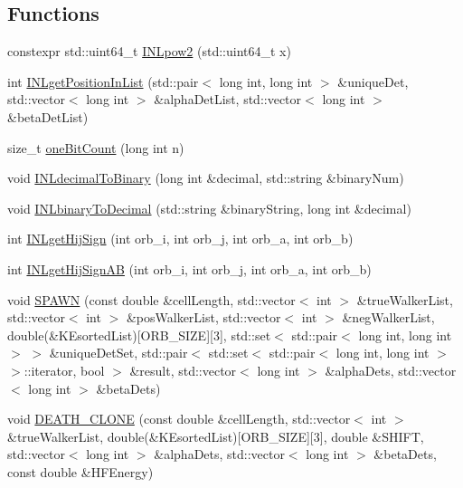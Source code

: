 \subsection*{Functions}
\begin{DoxyCompactItemize}
\item 
constexpr std\-::uint64\-\_\-t \hyperlink{UEG__MAIN__binarytest_8C_acc4e7d0bf8c76cb8b426703dc7115cdc}{I\-N\-Lpow2} (std\-::uint64\-\_\-t x)
\item 
int \hyperlink{UEG__MAIN__binarytest_8C_a622a9bfc71046778049dda8b8d82b829}{I\-N\-Lget\-Position\-In\-List} (std\-::pair$<$ long int, long int $>$ \&unique\-Det, std\-::vector$<$ long int $>$ \&alpha\-Det\-List, std\-::vector$<$ long int $>$ \&beta\-Det\-List)
\item 
size\-\_\-t \hyperlink{UEG__MAIN__binarytest_8C_a202c81ee7e30a4a9266c287caad49b02}{one\-Bit\-Count} (long int n)
\item 
void \hyperlink{UEG__MAIN__binarytest_8C_ad349fcf2533ef69216553d20f96d6320}{I\-N\-Ldecimal\-To\-Binary} (long int \&decimal, std\-::string \&binary\-Num)
\item 
void \hyperlink{UEG__MAIN__binarytest_8C_a34236e8d8d9c172c2a791f4e5f8c7e31}{I\-N\-Lbinary\-To\-Decimal} (std\-::string \&binary\-String, long int \&decimal)
\item 
int \hyperlink{UEG__MAIN__binarytest_8C_acc1ce2a3e5f999076de789546b8e277b}{I\-N\-Lget\-Hij\-Sign} (int orb\-\_\-i, int orb\-\_\-j, int orb\-\_\-a, int orb\-\_\-b)
\item 
int \hyperlink{UEG__MAIN__binarytest_8C_ae96d80bb5e115ea1aec37f72f2ac4979}{I\-N\-Lget\-Hij\-Sign\-A\-B} (int orb\-\_\-i, int orb\-\_\-j, int orb\-\_\-a, int orb\-\_\-b)
\item 
void \hyperlink{UEG__MAIN__binarytest_8C_a67cbe483fa671d09ebdf32a4e4fe6161}{S\-P\-A\-W\-N} (const double \&cell\-Length, std\-::vector$<$ int $>$ \&true\-Walker\-List, std\-::vector$<$ int $>$ \&pos\-Walker\-List, std\-::vector$<$ int $>$ \&neg\-Walker\-List, double(\&K\-Esorted\-List)\mbox{[}O\-R\-B\-\_\-\-S\-I\-Z\-E\mbox{]}\mbox{[}3\mbox{]}, std\-::set$<$ std\-::pair$<$ long int, long int $>$ $>$ \&unique\-Det\-Set, std\-::pair$<$ std\-::set$<$ std\-::pair$<$ long int, long int $>$ $>$\-::iterator, bool $>$ \&result, std\-::vector$<$ long int $>$ \&alpha\-Dets, std\-::vector$<$ long int $>$ \&beta\-Dets)
\item 
void \hyperlink{UEG__MAIN__binarytest_8C_aaa45cfd4de92450ce64a165b519966a3}{D\-E\-A\-T\-H\-\_\-\-C\-L\-O\-N\-E} (const double \&cell\-Length, std\-::vector$<$ int $>$ \&true\-Walker\-List, double(\&K\-Esorted\-List)\mbox{[}O\-R\-B\-\_\-\-S\-I\-Z\-E\mbox{]}\mbox{[}3\mbox{]}, double \&S\-H\-I\-F\-T, std\-::vector$<$ long int $>$ \&alpha\-Dets, std\-::vector$<$ long int $>$ \&beta\-Dets, const double \&H\-F\-Energy)

\end{DoxyCompactItemize}
